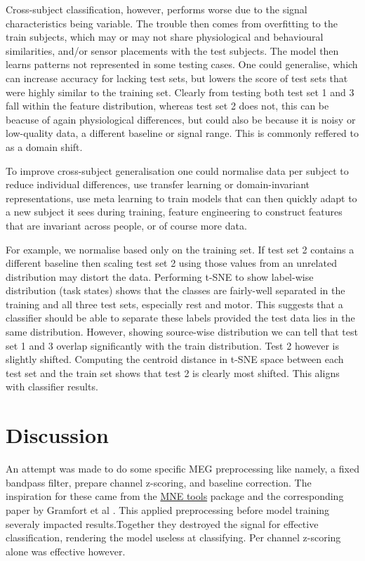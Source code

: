 \documentclass[conference]{IEEEtran}
\begin{document}
Cross-subject classification, however, performs worse due to the signal characteristics being variable. The trouble then comes from overfitting to the train subjects, which may or may not share physiological and behavioural similarities, and/or sensor placements with the test subjects. The model then learns patterns not represented in some testing cases. One could generalise, which can increase accuracy for lacking test sets, but lowers the score of test sets that were highly similar to the training set. Clearly from testing both test set 1 and 3 fall within the feature distribution, whereas test set 2 does not, this can be beacuse of again physiological differences, but could also be because it is noisy or low-quality data, a different baseline or signal range. This is commonly reffered to as a domain shift.

To improve cross-subject generalisation one could normalise data per subject to reduce individual differences, use transfer learning or domain-invariant representations, use meta learning to train models that can then quickly adapt to a new subject it sees during training, feature engineering to construct features that are invariant across people, or of course more data.

For example, we normalise based only on the training set. If test set 2 contains a different baseline then scaling test set 2 using those values from an unrelated distribution may distort the data. Performing t-SNE to show label-wise distribution (task states) shows that the classes are fairly-well separated in the training and all three test sets, especially rest and motor. This suggests that a classifier should be able to separate these labels provided the test data lies in the same distribution. However, showing source-wise distribution we can tell that test set 1 and 3 overlap significantly with the train distribution. Test 2 however is slightly shifted. Computing the centroid distance in t-SNE space between each test set and the train set shows that test 2 is clearly most shifted. This aligns with classifier results. 

\section{Discussion}
An attempt was made to do some specific MEG preprocessing like namely, a fixed bandpass filter, prepare channel z-scoring, and baseline correction. The inspiration for these came from the \href{https://mne.tools/stable/index.html}{MNE tools} package and the corresponding paper by Gramfort et al \cite{gramfort2013meg}. This applied preprocessing before model training severaly impacted results.Together they destroyed the signal for effective classification, rendering the model useless at classifying. Per channel z-scoring alone was effective however. 
\end{document}
